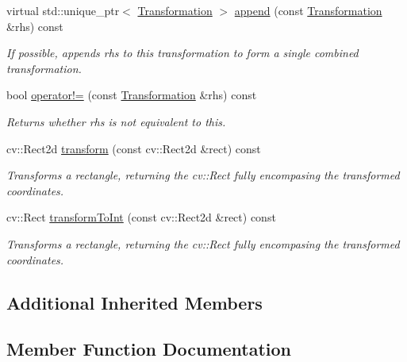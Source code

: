 \begin{DoxyCompactItemize}
virtual std\+::unique\+\_\+ptr$<$ \hyperlink{structdg_1_1deepcore_1_1geometry_1_1_transformation}{Transformation} $>$ \hyperlink{structdg_1_1deepcore_1_1geometry_1_1_transformation_ae67c450f28cd7fa5cb4607b5cf6d04a9}{append} (const \hyperlink{structdg_1_1deepcore_1_1geometry_1_1_transformation}{Transformation} \&rhs) const 
\begin{DoxyCompactList}\small\item\em If possible, appends {\ttfamily rhs} to this transformation to form a single combined transformation. \end{DoxyCompactList}\item 
bool \hyperlink{structdg_1_1deepcore_1_1geometry_1_1_transformation_aacb7997a69bed6d666bdd8d4aa276f7a}{operator!=} (const \hyperlink{structdg_1_1deepcore_1_1geometry_1_1_transformation}{Transformation} \&rhs) const 
\begin{DoxyCompactList}\small\item\em Returns whether {\ttfamily rhs} is not equivalent to this. \end{DoxyCompactList}\item 
cv\+::\+Rect2d \hyperlink{structdg_1_1deepcore_1_1geometry_1_1_transformation_abdd4b258475c95ec1ac250e7711f7016}{transform} (const cv\+::\+Rect2d \&rect) const 
\begin{DoxyCompactList}\small\item\em Transforms a rectangle, returning the {\ttfamily cv\+::\+Rect} fully encompasing the transformed coordinates. \end{DoxyCompactList}\item 
cv\+::\+Rect \hyperlink{structdg_1_1deepcore_1_1geometry_1_1_transformation_a25cfe864cea2314105600d8c9cbc65e4}{transform\+To\+Int} (const cv\+::\+Rect2d \&rect) const 
\begin{DoxyCompactList}\small\item\em Transforms a rectangle, returning the {\ttfamily cv\+::\+Rect} fully encompasing the transformed coordinates. \end{DoxyCompactList}\end{DoxyCompactItemize}
\subsection*{Additional Inherited Members}


\subsection{Member Function Documentation}
